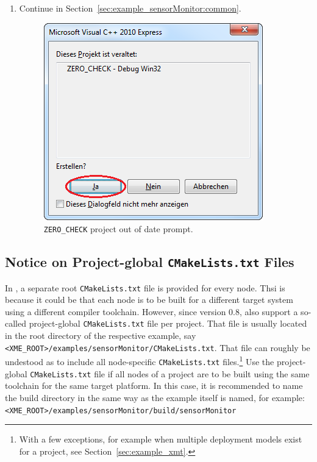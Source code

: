 \begin{enumerate}
	\item Continue in Section~\ref{sec:example_sensorMonitor:common}.

\begin{figure}[htpb]
	\centering
	\includegraphics[scale=0.75]{figures/vs_zero_check_edited.png}
	\caption{\texttt{ZERO\_CHECK} project out of date prompt.}
	\label{fig:vs_zero_check}
\end{figure}

\end{enumerate}

\subsection{Notice on Project-global \texttt{CMakeLists.txt} Files}
\label{sec:example_sensorMonitor:projectGlobal}

In \xme, a separate root \texttt{CMakeLists.txt} file is provided for every node.
Thsi is because it could be that each node is to be built for a different target system using a different compiler toolchain.
However, since version 0.8, \xme also support a so-called project-global \texttt{CMakeLists.txt} file per project.
That file is usually located in the root directory of the respective example, say \verb|<XME_ROOT>/examples/sensorMonitor/CMakeLists.txt|.
That file can roughly be undestood as to include all node-specific \texttt{CMakeLists.txt} files.\footnote{%
	With a few exceptions, for example when multiple deployment models exist for a project, see Section~\ref{sec:example_xmt}.%
}
Use the project-global \texttt{CMakeLists.txt} file if all nodes of a project are to be built using the same toolchain for the same target platform.
In this case, it is recommended to name the build directory in the same way as the example itself is named, for example:\\
\verb|<XME_ROOT>/examples/sensorMonitor/build/sensorMonitor|


